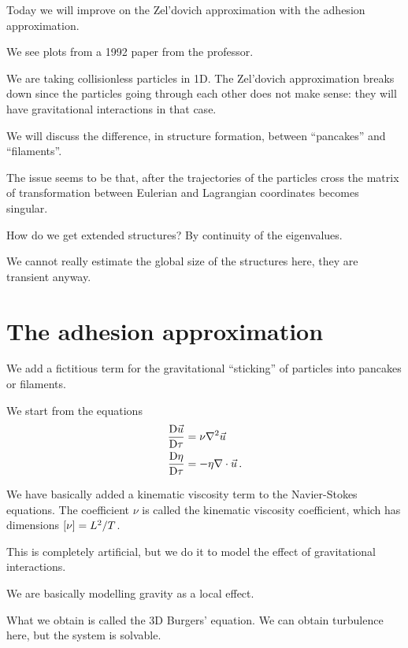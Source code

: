 \documentclass[main.tex]{subfiles}
\begin{document}

Today we will improve on the Zel'dovich approximation with the adhesion approximation.

We see plots from a 1992 paper from the professor. 

We are taking collisionless particles in 1D. The Zel'dovich approximation breaks down since the particles going through each other does not make sense: they will have gravitational interactions in that case.

We will discuss the difference, in structure formation, between ``pancakes'' and ``filaments''.

The issue seems to be that, after the trajectories of the particles cross the matrix of transformation between Eulerian and Lagrangian coordinates becomes singular.

How do we get extended structures? By continuity of the eigenvalues. 

We cannot really estimate the global size of the structures here, they are transient anyway.

\section{The adhesion approximation}

We add a fictitious term for the gravitational ``sticking'' of particles into pancakes or filaments. 

We start from the equations
%
\begin{align}
\frac{\mathrm{D} \vec{u}}{\mathrm{D} \tau } &= \nu \nabla^2 \vec{u}  \\
\frac{\mathrm{D} \eta }{\mathrm{D} \tau } &= - \eta \nabla \cdot \vec{u}
\,.
\end{align}

We have basically added a kinematic viscosity term to the Navier-Stokes equations.
The coefficient \(\nu \) is called the kinematic viscosity coefficient, which has dimensions \(\qty[\nu ] = L^2 /T\).

This is completely artificial, but we do it to model the effect of gravitational interactions. 

We are basically modelling gravity as a local effect. 

What we obtain is called the 3D Burgers' equation. 
We can obtain turbulence here, but the system is solvable.
\end{document}
